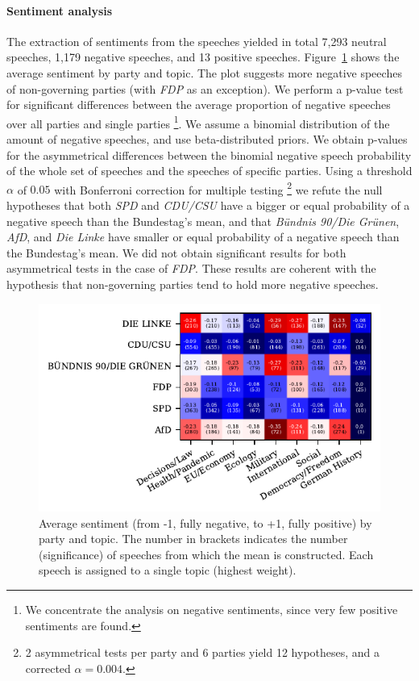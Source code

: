 \documentclass{article}
\begin{document}
\paragraph{Sentiment analysis}
The extraction of sentiments from the speeches yielded in total 7,293 neutral speeches, 1,179 negative speeches, and 13 positive speeches.
Figure~\ref{sentiments_plot} shows the average sentiment by party and topic.
The plot suggests more negative speeches of non-governing parties (with \textit{FDP} as an exception).
We perform a p-value test for significant differences between the average proportion of negative speeches over all parties and single parties
\footnote{We concentrate the analysis on negative sentiments, since very few positive sentiments are found.}.
We assume a binomial distribution of the amount of negative speeches, and use beta-distributed priors.
We obtain p-values for the asymmetrical differences between the binomial negative speech probability of the whole set of speeches and the speeches of specific parties.
Using a threshold $\alpha$ of $0.05$ with Bonferroni correction for multiple testing
\footnote{2 asymmetrical tests per party and 6 parties yield 12 hypotheses, and a corrected $\alpha=0.004$.}
we refute the null hypotheses that both \textit{SPD} and \textit{CDU/CSU} have a bigger or equal probability of a negative speech than the Bundestag's mean,
and that \textit{Bündnis 90/Die Grünen}, \textit{AfD}, and \textit{Die Linke} have smaller or equal probability of a negative speech than the Bundestag's mean.
We did not obtain significant results for both asymmetrical tests in the case of \textit{FDP}.
These results are coherent with the hypothesis that non-governing parties tend to hold more negative speeches.

\begin{figure}
  \centering
  \includegraphics[width=0.9\linewidth]{images/sentiments_confusion.pdf}
  \captionsetup{width=0.9\linewidth}
  \caption{
    Average sentiment (from -1, fully negative, to +1, fully positive) by party and topic.
    The number in brackets indicates the number (significance) of speeches from which the mean is constructed.
    Each speech is assigned to a single topic (highest weight).
  }
  \label{sentiments_plot}
\end{figure}
\end{document}
